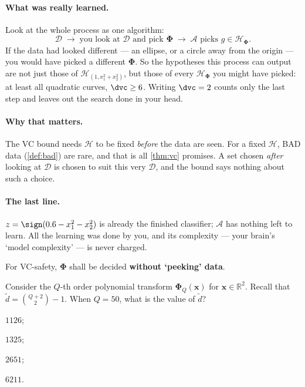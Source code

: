 \paragraph{What was really learned.} Look at the whole process as one
algorithm:
\[
    \mathcal{D} \;\longrightarrow\; \text{you look at } \mathcal{D} \text{ and
    pick } \bm{\Phi} \;\longrightarrow\; \mathcal{A} \text{ picks } g \in
    \mathcal{H}_{\bm{\Phi}} .
\]
If the data had looked different --- an ellipse, or a circle away from the
origin --- you would have picked a different \(\bm{\Phi}\). So the hypotheses
this process can output are not just those of \(\mathcal{H}_{(1, x_1^2 +
x_2^2)}\), but those of every \(\mathcal{H}_{\bm{\Phi}}\) you might have
picked: at least all quadratic curves, \(\dvc \ge 6\). Writing \(\dvc = 2\)
counts only the last step and leaves out the search done in your head.

\paragraph{Why that matters.} The VC bound needs \(\mathcal{H}\) to be fixed
\emph{before} the data are seen. For a fixed \(\mathcal{H}\), BAD data
(\autoref{def:bad}) are rare, and that is all \autoref{thm:vc} promises. A
set chosen \emph{after} looking at \(\mathcal{D}\) is chosen to suit this very
\(\mathcal{D}\), and the bound says nothing about such a choice.

\paragraph{The last line.} \(z = \sign(0.6 - x_1^2 - x_2^2)\) is already the
finished classifier; \(\mathcal{A}\) has nothing left to learn. All the
learning was done by you, and its complexity --- your brain's `model
complexity' --- is never charged.

\begin{moral}
    For VC-safety, \(\bm{\Phi}\) shall be decided \textbf{without `peeking'
    data}.
\end{moral}

\begin{exercise}
    Consider the \(Q\)-th order polynomial transform \(\bm{\Phi}_Q(\bm{x})\)
    for \(\bm{x} \in \mathbb{R}^2\). Recall that \(\tilde{d} = \binom{Q +
    2}{2} - 1\). When \(Q = 50\), what is the value of \(\tilde{d}\)?
    \begin{enumerate*}[(1)]
        \item \(1126\); \item \(1325\); \item \(2651\); \item \(6211\).
    \end{enumerate*}
\end{exercise}

